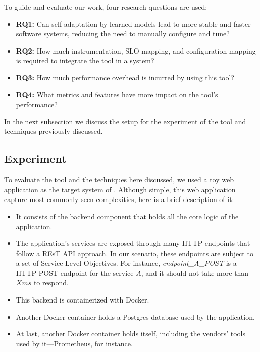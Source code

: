 To guide and evaluate our work, four research questions are used:

\begin{itemize}
  \item \textbf{RQ1:} Can self-adaptation by learned models lead to more stable and faster software systems, reducing the need to manually configure and tune?
  \item \textbf{RQ2:} How much instrumentation, SLO mapping, and configuration mapping is required to integrate the tool in a system?
  \item \textbf{RQ3:} How much performance overhead is incurred by using this tool?
  \item \textbf{RQ4:} What metrics and features have more impact on the tool's performance?
\end{itemize}

In the next subsection we discuss the setup for the experiment of the tool and techniques previously discussed.

\subsection{Experiment}

To evaluate the tool and the techniques here discussed, we used a toy web application as the target system of \projectname{}. Although simple, this web application capture most commonly seen complexities, here is a brief description of it:

\begin{itemize}
  \item It consists of the backend component that holds all the core logic of the application.
  \item The application's services are exposed through many HTTP endpoints that follow a REsT API approach. In our scenario, these endpoints are subject to a set of Service Level Objectives. For instance, \textit{endpoint\_A\_POST} is a HTTP POST endpoint for the service $A$, and it should not take more than $X ms$ to respond.
  \item This backend is containerized with Docker.
  \item Another Docker container holds a Postgres database used by the application.
  \item At last, another Docker container holds \projectname{} itself, including the vendors' tools used by it---Prometheus, for instance.
\end{itemize}

